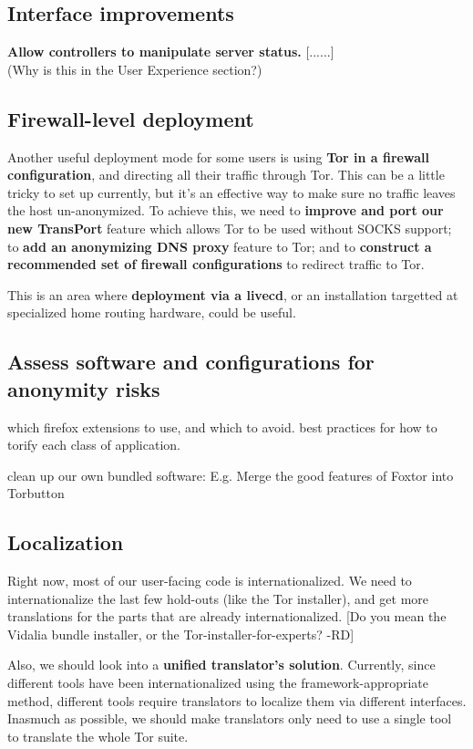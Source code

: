 \documentclass{article}
\newcommand{\tmp}[1]{{\bf #1} [......] \\}
\begin{document}
\subsection{Interface improvements}
\tmp{Allow controllers to manipulate server status.}
(Why is this in the User Experience section?)


\subsection{Firewall-level deployment}
Another useful deployment mode for some users is using {\bf Tor in a firewall
  configuration}, and directing all their traffic through Tor.  This can be a
little tricky to set up currently, but it's an effective way to make sure no
traffic leaves the host un-anonymized.  To achieve this, we need to {\bf
  improve and port our new TransPort} feature which allows Tor to be used
without SOCKS support; to {\bf add an anonymizing DNS proxy} feature to Tor;
and to {\bf construct a recommended set of firewall configurations} to redirect
traffic to Tor.

This is an area where {\bf deployment via a livecd}, or an installation
targetted at specialized home routing hardware, could be useful.

\subsection{Assess software and configurations for anonymity risks}

which firefox extensions to use, and which to avoid. best practices for
how to torify each class of application.

clean up our own bundled software:
E.g. Merge the good features of Foxtor into Torbutton

\subsection{Localization}
Right now, most of our user-facing code is internationalized.  We need to
internationalize the last few hold-outs (like the Tor installer), and get
more translations for the parts that are already internationalized.
[Do you mean the Vidalia bundle installer, or the Tor-installer-for-experts? -RD]

Also, we should look into a {\bf unified translator's solution}.  Currently,
since different tools have been internationalized using the
framework-appropriate method, different tools require translators to localize
them via different interfaces.  Inasmuch as possible, we should make
translators only need to use a single tool to translate the whole Tor suite.
\end{document}
